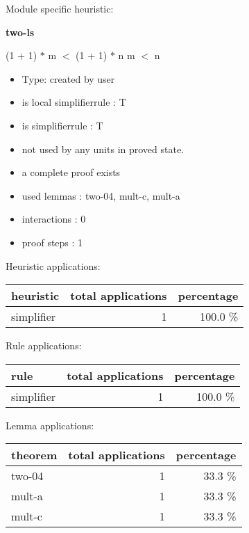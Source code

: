 \documentclass[a4paper]{article}
\begin{document}
Module specific heuristic:

\pagebreak

{\LARGE\bf two-ls}\label{lemma-two-ls}

\medskip

 \Fol (1 + 1) $*$ m $<$ (1 + 1) $*$ n \Equiv m $<$ n

\begin{itemize}

\item Type: created by user

\item is local simplifierrule : T
\item is simplifierrule : T
\item not used by any units in proved state.
\item       a complete proof exists
\item       used lemmas  : two-04, mult-c, mult-a
\item       interactions : 0
\item       proof steps  : 1
\end{itemize}

\medskip


Heuristic applications:

\begin{supertabular}{l|r|r}
heuristic	& total applications & percentage \\ \hline
simplifier & 1 & 100.0 \% \\

\end{supertabular}

Rule applications:

\begin{supertabular}{l|r|r}
rule	        & total applications & percentage \\ \hline
simplifier & 1 & 100.0 \% \\

\end{supertabular}

Lemma applications:

\begin{supertabular}{l|r|r}
theorem	        & total applications & percentage \\ \hline
two-04 & 1 & 33.3 \% \\
mult-a & 1 & 33.3 \% \\
mult-c & 1 & 33.3 \% \\

\end{supertabular}
\end{document}
